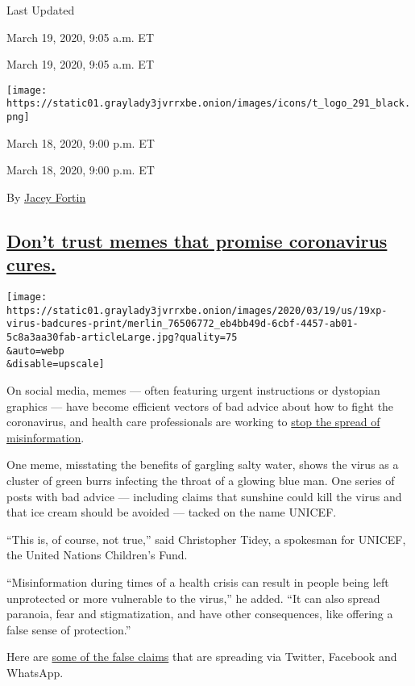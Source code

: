 Last Updated

March 19, 2020, 9:05 a.m. ET

March 19, 2020, 9:05 a.m. ET

\texttt{[image: https://static01.graylady3jvrrxbe.onion/images/icons/t\_logo\_291\_black.png]}

March 18, 2020, 9:00 p.m. ET

March 18, 2020, 9:00 p.m. ET

By \href{https://www.nytimes3xbfgragh.onion/by/jacey-fortin}{Jacey
Fortin}

\hypertarget{dont-trust-memes-that-promise-coronavirus-cures}{%
\subsection{\texorpdfstring{\protect\hyperlink{dont-trust-memes-that-promise-coronavirus-cures}{Don't
trust memes that promise coronavirus
cures.}}{Don't trust memes that promise coronavirus cures.}}\label{dont-trust-memes-that-promise-coronavirus-cures}}

\texttt{[image: https://static01.graylady3jvrrxbe.onion/images/2020/03/19/us/19xp-virus-badcures-print/merlin\_76506772\_eb4bb49d-6cbf-4457-ab01-5c8a3aa30fab-articleLarge.jpg?quality=75\\\&auto=webp\\\&disable=upscale]}

On social media, memes --- often featuring urgent instructions or
dystopian graphics --- have become efficient vectors of bad advice about
how to fight the coronavirus, and health care professionals are working
to
\href{https://www.nytimes3xbfgragh.onion/article/coronavirus-myths.html}{stop
the spread of misinformation}.

One meme, misstating the benefits of gargling salty water, shows the
virus as a cluster of green burrs infecting the throat of a glowing blue
man. One series of posts with bad advice --- including claims that
sunshine could kill the virus and that ice cream should be avoided ---
tacked on the name UNICEF.

``This is, of course, not true,'' said Christopher Tidey, a spokesman
for UNICEF, the United Nations Children's Fund.

``Misinformation during times of a health crisis can result in people
being left unprotected or more vulnerable to the virus,'' he added. ``It
can also spread paranoia, fear and stigmatization, and have other
consequences, like offering a false sense of protection.''

Here are
\href{https://www.nytimes3xbfgragh.onion/2020/03/18/health/coronavirus-cure-gargle-water.html}{some
of the false claims} that are spreading via Twitter, Facebook and
WhatsApp.

